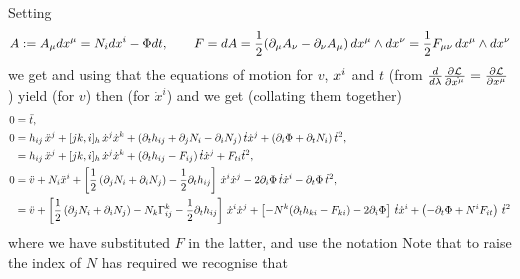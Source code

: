 \documentclass{article}
\begin{document}
Setting
$$A:=A_\mu dx\sp{\mu}=N_i dx\sp{i}-\Phi dt,\qquad
F=dA=\frac12 (\partial_\mu A_\nu- \partial_\nu A_\mu)\, dx\sp\mu \wedge dx\sp\nu =\frac12 F_{\mu\nu}
\, dx\sp\mu \wedge dx\sp\nu
$$
we get 
and using that the equations of motion for $v$, $x\sp{i}$ and $t$ (from $\frac{d}{d\lambda}\pd[\mc{L}]{\dot{x^\mu}} = \pd[\mc{L}]{x^\mu}$) yield
(for $v$) then 
(for $\dot{x}^i$) and 
we get (collating them together)
\begin{align*}
0&=\ddot t,\\
0&= h_{ij}\,\ddot x\sp{j}+[jk,i]_h\, \dot x\sp{j} \dot x\sp{k} +
(\partial_t h_{ij}+\partial_j N_i-\partial_i N_j) \,\dot t \dot x\sp{j} +\left(\partial_i\Phi+\partial_t N_i\right) \dot t^2,\\
&= h_{ij}\,\ddot x\sp{j}+[jk,i]_h\, \dot x\sp{j} \dot x\sp{k}+ (\partial_t h_{ij} -F_{ij})\, \dot t \dot x\sp{j}
+F_{ti}\dot t\sp2,\\
0&=\ddot v+ N_i\ddot x\sp{i}+ \left[ \frac12 \left(\partial_j N_i+\partial_i N_j\right)- \frac12 \partial_t h_{ij}
\right]\,\dot x\sp{i} \dot x\sp{j} -2\partial_i\Phi \,\dot t \dot x\sp{i} - \partial_t\Phi\, \dot t^2,\\
&=\ddot v+
 \left[ \frac12 \left(\partial_j N_i+\partial_i N_j\right)-N_k \Gamma\sp{k}_{ij}- \frac12 \partial_t h_{ij}
\right]\,\dot x\sp{i} \dot x\sp{j} 
+\left[ -N\sp{k} (\partial_t h_{ki} -F_{ki}) -2\partial_i\Phi \right]\,\dot t \dot x\sp{i} 
+\left(- \partial_t\Phi +N\sp{i}F_{it} \right)\, \dot t^2
\end{align*}
where we have substituted $F$ in the latter, and use the notation
Note that to raise the index of $N$ has required we recognise that 
\end{document}
